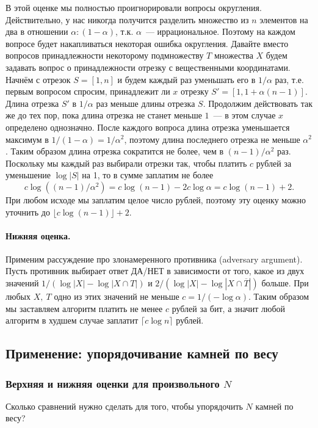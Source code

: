 \documentclass[12pt]{article}
\theoremstyle{definition}
\theoremstyle{plain}
\theoremstyle{remark}
\begin{document}
В этой оценке мы полностью проигнорировали вопросы округления. Действительно, у нас никогда получится разделить множество из $n$ элементов на два в отношении $\alpha:(1-\alpha)$, т.к. $\alpha$~--- иррациональное. Поэтому на каждом вопросе будет накапливаться некоторая ошибка округления. Давайте вместо вопросов принадлежности некоторому подмножеству $T$ множества $X$ будем задавать вопрос о принадлежности отрезку с вещественными координатами. Начнём с отрезок $S = [1,n]$ и будем каждый раз уменьшать его в $1/\alpha$ раз, т.е. первым вопросом спросим, принадлежит ли $x$ отрезку $S' = [1, 1 + \alpha(n-1)]$. Длина отрезка $S'$ в $1/\alpha$ раз меньше длины отрезка $S$. Продолжим действовать так же до тех пор, пока длина отрезка не станет меньше $1$~--- в этом случае $x$ определено однозначно. После каждого вопроса длина отрезка уменьшается
максимум в $1/(1 - \alpha) = 1/\alpha^2$, поэтому длина последнего отрезка не меньше $\alpha^2$. Таким образом длина отрезка сократится не более, чем в $(n-1)/\alpha^2$ раз. Поскольку мы каждый раз выбирали отрезки так, чтобы платить $c$ рублей за уменьшение $\log |S|$ на 1, то в сумме заплатим не более 
\[
    c\log((n-1)/\alpha^2) = c\log(n-1) - 2c\log \alpha = c\log(n-1) + 2.\] 
При любом исходе мы заплатим целое число рублей, поэтому эту оценку можно уточнить до $\lfloor c\log(n-1)\rfloor + 2$.

\paragraph{Нижняя оценка.} Применим рассуждение про злонамеренного противника (adversary argument). Пусть противник
выбирает ответ ДА/НЕТ в зависимости от того, какое из двух значений \(1/(\log |X| - \log|X \cap T|)\) и \(2/(\log |X| -
\log|X \cap \overline T|)\) больше. При любых \(X,\ T\) одно из этих значений не меньше \(c = 1/(-\log\alpha)\). Таким
образом мы заставляем алгоритм платить не менее \(c\) рублей за бит, а значит любой алгоритм в худшем случае заплатит
\(\lceil c\log n\rceil\) рублей.

\subsection{Применение: упорядочивание камней по весу}
\subsubsection{Верхняя и нижняя оценки для произвольного $N$}
Сколько сравнений нужно сделать для того, чтобы упорядочить \(N\) камней по весу?
\end{document}

